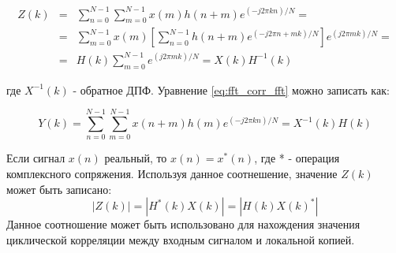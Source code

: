 \begin{center}
\begin{eqnarray}
	\label{eq:fft_corr_fft}
	Z(k) & = & \sum\limits_{n=0}^{N-1}\sum\limits_{m=0}^{N-1}{x(m)h(n+m)e^{(-j2\pi{kn})/N}}=\nonumber \\
	& = & \sum\limits_{m=0}^{N-1}{x(m)}[\sum\limits_{n=0}^{N-1}h(n+m)e^{(-j2\pi{n+m}k)/N}]e^{(j2\pi{m}k)/N}=\\
	& = & H(k)\sum\limits_{m=0}^{N-1}e^{(j2\pi{m}k)/N} = X(k)H^{-1}(k)\nonumber 
\end{eqnarray}
\end{center}
где ${X^{-1}(k)}$ - обратное ДПФ. Уравнение \ref{eq:fft_corr_fft} можно записать как:

\begin{equation}
	\label{eq:fft_corr_fft_rev}
	Y(k) = \sum\limits_{n=0}^{N-1}\sum\limits_{m=0}^{N-1}{x(n+m)h(m)e^{(-j2\pi{kn})/N}}=X^{-1}(k)H(k)
\end{equation}

Если сигнал $x(n)$ реальный, то $x(n) = x^*(n)$, где * - операция комплексного сопряжения. Используя данное соотнешение,
значение $Z(k)$ может быть записано:
\begin{equation}
	\label{eq:fft_magnitude}
	|Z(k)|=|H^*(k)X(k)|=|H(k)X(k)^*|
\end{equation}
Данное соотношение может быть использовано для нахождения значения циклической корреляции между входным сигналом и 
локальной копией.

\newpage
